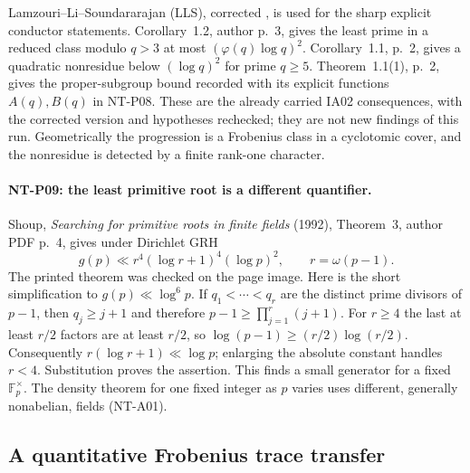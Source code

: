\documentclass[11pt,a4paper]{article}
\begin{document}
Lamzouri--Li--Soundararajan (LLS), corrected
, is used for the sharp explicit conductor
statements.  Corollary~1.2, author p.~3, gives the least prime in a reduced
class modulo $q>3$ at most $(\varphi(q)\log q)^2$.
Corollary~1.1, p.~2, gives a quadratic nonresidue below $(\log q)^2$ for
prime $q\ge5$.  Theorem~1.1(1), p.~2, gives the proper-subgroup bound
recorded with its explicit functions $A(q),B(q)$ in NT-P08.
These are the already carried IA02 consequences, with the corrected
version and hypotheses rechecked; they are not new findings of this run.
Geometrically the progression is a Frobenius class in a cyclotomic cover,
and the nonresidue is detected by a finite rank-one character.

\paragraph{NT-P09: the least primitive root is a different quantifier.}
Shoup, \emph{Searching for primitive roots in finite fields} (1992),
Theorem~3, author PDF p.~4, gives under Dirichlet GRH
\[
 g(p)\ll r^4(\log r+1)^4(\log p)^2,
 \qquad r=\omega(p-1).
\]
The printed theorem was checked on the page image.  Here is the short
simplification to $g(p)\ll\log^6p$.  If $q_1<\cdots<q_r$ are the distinct
prime divisors of $p-1$, then $q_j\ge j+1$ and therefore
$p-1\ge\prod_{j=1}^r(j+1)$.  For $r\ge4$ the last at least $r/2$ factors
are at least $r/2$, so
$\log(p-1)\ge(r/2)\log(r/2)$.  Consequently
$r(\log r+1)\ll\log p$; enlarging the absolute constant handles $r<4$.
Substitution proves the assertion.  This finds a small generator for a
fixed $\mathbb F_p^\times$.  The density theorem for one fixed integer
as $p$ varies uses different, generally nonabelian, fields (NT-A01).

\subsection{A quantitative Frobenius trace transfer}
\end{document}
